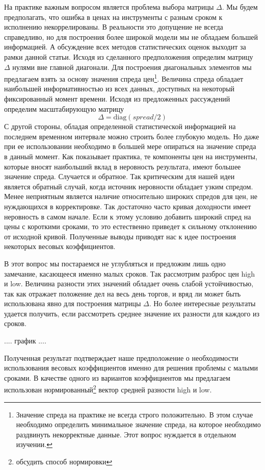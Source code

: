 \documentclass[10pt]{article}
\theoremstyle{definition}
\theoremstyle{remark}
\theoremstyle{plain}
\newcommand{\diag}{\mathrm{diag}}
\begin{document}
 На практике важным вопросом является проблема выбора матрицы $\Delta$. Мы будем предполагать, что ошибка в ценах на инструменты с разным сроком к исполнению некоррелированы. В реальности это допущение не всегда справедливо, но для построения более широкой модели мы не обладаем большей информацией. А обсуждение всех методов статистических оценок выходит за рамки данной статьи. Исходя из сделанного предположения определим матрицу $\Delta$ нулями вне главной диагонали. Для построения диагональных элементов мы предлагаем взять за основу значения спреда цен\footnote{Значение спреда на практике не всегда строго положительно. В этом случае необходимо определить минимальное значение спреда, на которое необходимо раздвинуть некорректные данные. Этот вопрос нуждается в отдельном изучении.}.
Величина спреда обладает наибольшей информативностью из всех данных, доступных на некоторый фиксированный момент времени. Исходя из предложенных рассуждений определим масштабирующую матрицу $$\Delta = \diag(spread/2)$$
С другой стороны, обладая определенной статистической информацией на последнем временном интервале можно строить более глубокую модель. Но даже при ее использовании необходимо в большей мере опираться на значение спреда в данный момент. Как показывает практика, те компоненты цен на инструменты, которые вносят наибольший вклад в неровность результата, имеют большее значение спреда. Случается и обратное. Так критическим для нашей идеи является обратный случай, когда источник неровности обладает узким спредом. Менее неприятным является наличие относительно широких спредов для цен, не нуждающихся в корректировке. Так достаточно часто кривая доходности имеет неровность в самом начале. Если к этому условию добавить широкий спред на цены с короткими сроками, то это естественно приведет к сильному отклонению от исходной кривой. Полученные выводы приводят нас к идее построения некоторых весовых коэффициентов. 

В этот вопрос мы постараемся не углубляться и предложим лишь одно замечание, касающееся именно малых сроков. Так рассмотрим разброс цен high и low. Величина разности этих значений обладает очень слабой устойчивостью, так как отражает положение дел на весь день торгов, и вряд ли может быть использована явно для построения матрицы $\Delta$. Но более интересные результаты удается получить, если рассмотреть среднее значение их разности для каждого из сроков.

....
график
....

Полученная результат подтверждает наше предположение о необходимости использования весовых коэффициентов именно для решения проблемы с малыми сроками. В качестве одного из вариантов коэффициентов мы предлагаем использован нормированный\footnote{обсудить способ нормировки} вектор средней разности high и low.
\end{document}
